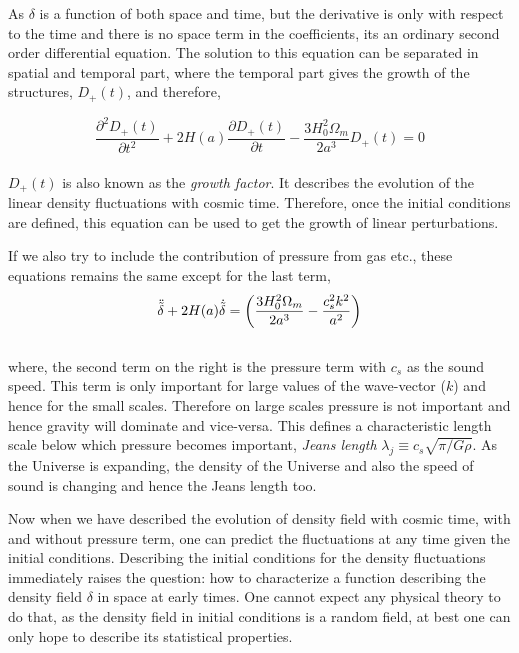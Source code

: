 As $\delta$ is a function of both space
and time, but the derivative is only with respect to the time and there is 
no space term in the coefficients, its an ordinary second order differential equation.
The solution to this equation can be 
separated in spatial and temporal part, where the temporal part gives the 
growth of the structures, $D_+(t)$, and therefore,

\begin{equation}
	\dfrac{\partial^2 D_+(t)}{\partial t^2} + 2 H(a)
		\dfrac{\partial D_+(t)}{\partial t}
		- \dfrac{3H_0^2 \Omega_m}{2a^3} D_+(t) = 0
		\label{eqn:growthfactor}
\end{equation}
\\
$D_+(t)$ is also known as the {\it growth factor}. It describes the evolution of the
linear density fluctuations with cosmic time. Therefore, once the initial conditions
are defined, this equation can be used to get the growth of linear perturbations. 

If we also try to include the contribution of pressure from gas etc., these equations remains
the same except for the last term,
\begin{equation}
\centering
	\ddot{\tilde{\delta}} + 2H(a) \dot{\tilde{\delta}} = 
					\left( \dfrac{3H_0^2\Omega_m}{2a^3} - \dfrac{c_s^2k^2}{a^2}   \right)
\end{equation}
\\
where, the second term on the right is the pressure term with $c_s$ as the sound speed. 
This term is only important
for large values of the wave-vector ($k$) and hence for the small scales. Therefore on 
large scales pressure is not important and hence gravity will dominate and vice-versa. 
This defines a characteristic length scale below which pressure becomes important, 
{\it Jeans length} $\lambda_j \equiv c_s \sqrt{\pi/G\rho}$. As the Universe is 
expanding, the density of the Universe and also the speed of sound is changing 
and hence the Jeans length too.

Now when we have described the evolution of density field with cosmic time, with and
without pressure term, one can predict the fluctuations at any time given the initial
conditions. Describing the initial conditions for the density fluctuations immediately
raises the question: how to characterize a function describing the density field $\delta$
in space at early times. One cannot expect any physical theory to do that, as the density field
in initial conditions is a random field, at best one can only hope to describe its
statistical properties. 

